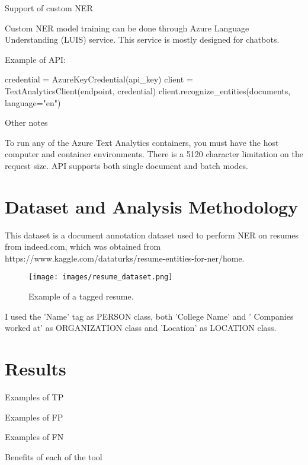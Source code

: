 \documentclass[conference]{IEEEtran}
\begin{document}
Support of custom NER

Custom NER model training can be done through Azure Language Understanding (LUIS) service. This service is mostly designed for chatbots.

Example of API:

\begin{verbatimtab}[4]
credential = AzureKeyCredential(api_key)
client = TextAnalyticsClient(endpoint, 
	credential)
client.recognize_entities(documents,
	 language="en")
\end{verbatimtab}

Other notes

To run any of the Azure Text Analytics containers, you must have the host computer and container environments. There is a 5120 character limitation on the request size. API supports both single document and batch modes.

\section{Dataset and Analysis Methodology}

This dataset is a document annotation dataset used to perform NER on resumes from indeed.com, which was obtained from https://www.kaggle.com/dataturks/resume-entities-for-ner/home.

\begin{figure}[htbp]
\centerline{\texttt{[image: images/resume\_dataset.png]}}
\caption{Example of a tagged resume.}
\label{fig1}
\end{figure}

I used the 'Name' tag as PERSON class, both 'College Name' and ' Companies worked at' as ORGANIZATION class and 'Location' as LOCATION class.


\section{Results}

Examples of TP

Examples of FP

Examples of FN

Benefits of each of the tool
\end{document}

